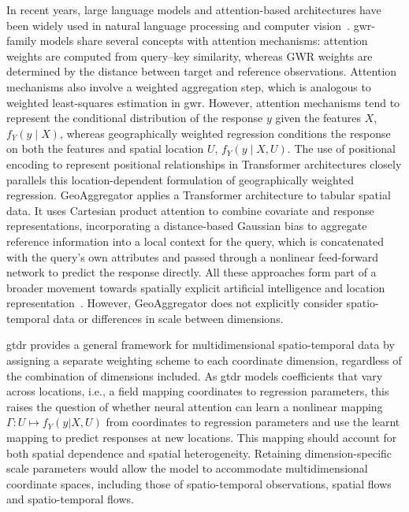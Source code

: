\documentclass[]{interact}
\newcommand{\GAgg}{GeoAggregator\xspace}
\begin{document}
In recent years, large language models and attention-based architectures have been widely used in natural language processing and computer vision~\citep{VaswaniShazeer-2023}.
\Gls{gwr}-family models share several concepts with attention mechanisms:
attention weights are computed from query–key similarity,
whereas GWR weights are determined by the distance between target and reference observations.
Attention mechanisms also involve a weighted aggregation step,
which is analogous to weighted least-squares estimation in \gls{gwr}.
However, attention mechanisms tend to represent the conditional distribution of the response \(y\) given the features \(X\), \(f_Y(y\mid X)\),
whereas geographically weighted regression conditions the response on both the features and spatial location \(U\), \(f_Y(y\mid X,U)\).
The use of positional encoding to represent positional relationships in Transformer architectures closely parallels this location-dependent formulation of geographically weighted regression.
\GAgg applies a Transformer architecture to tabular spatial data.
It uses Cartesian product attention to combine covariate and response representations,
incorporating a distance-based Gaussian bias to aggregate reference information into a local context for the query,
which is concatenated with the query's own attributes and passed through a nonlinear feed-forward network to predict the response directly.
All these approaches form part of a broader movement towards spatially explicit artificial intelligence and location representation~\citep{JanowiczGao-2020,MaiJanowicz-2022,ReichsteinCamps-Valls-2019}.
However, \GAgg does not explicitly consider spatio-temporal data or differences in scale between dimensions.

\Gls{gtdr} provides a general framework for multidimensional spatio-temporal data by assigning a separate weighting scheme to each coordinate dimension, regardless of the combination of dimensions included.
As \gls{gtdr} models coefficients that vary across locations,
i.e., a field mapping coordinates to regression parameters,
this raises the question of whether neural attention can learn a nonlinear mapping $\Gamma: U \mapsto f_Y(y|X,U)$ from coordinates to regression parameters and use the learnt mapping to predict responses at new locations.
This mapping should account for both spatial dependence and spatial heterogeneity.
Retaining dimension-specific scale parameters would allow the model to accommodate multidimensional coordinate spaces, including those of spatio-temporal observations, spatial flows and spatio-temporal flows.
\end{document}
